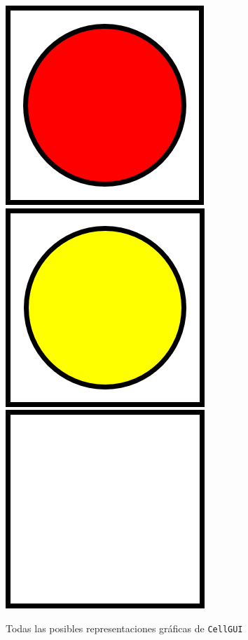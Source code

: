 \documentclass[../DocumentoOficial.tex]{subfiles}
\begin{document}
\begin{center}
\includegraphics[scale=0.65]{redCube.png}
\includegraphics[scale=0.65]{yellowCube.png}
\includegraphics[scale=0.65]{emptyCell.png}

Todas las posibles representaciones gráficas de \texttt{CellGUI}
\end{center}
\end{document}
